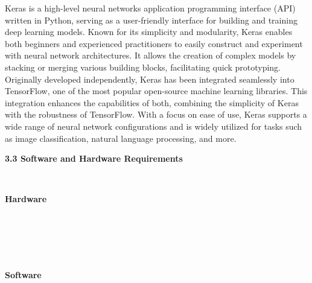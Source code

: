 \documentclass[12pt, English]{article}
\begin{document}
\begin{normalsize}
Keras is a high-level neural networks application programming interface (API) written in Python, serving as a user-friendly interface for building and training deep learning models. Known for its simplicity and modularity, Keras enables both beginners and experienced practitioners to easily construct and experiment with neural network architectures. It allows the creation of complex models by stacking or merging various building blocks, facilitating quick prototyping. Originally developed independently, Keras has been integrated seamlessly into TensorFlow, one of the most popular open-source machine learning libraries. This integration enhances the capabilities of both, combining the simplicity of Keras with the robustness of TensorFlow. With a focus on ease of use, Keras supports a wide range of neural network configurations and is widely utilized for tasks such as image classification, natural language processing, and more. \\

\begin{large}
\textbf{ 3.3  Software and Hardware Requirements}\\
\end{large}\\ 
\begin{large}
\textbf{Hardware}
\end{large}
\begin{enumerate}
     \\
    \\
    \\
    \\
\end{enumerate}

\begin{large}
\textbf{Software}
\end{large}
\begin{enumerate}
     \\
    \\
     
\end{enumerate}
\newpage

\begin{center}

\end{center}
\end{normalsize}
\end{document}
